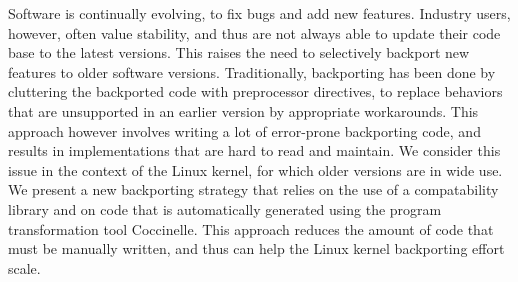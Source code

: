 Software is continually evolving, to fix bugs and add new features.
Industry users, however, often value stability, and thus are not always
able to update their code base to the latest versions.  This raises the
need to selectively backport new features to older software versions.
Traditionally, backporting has been done by cluttering the backported code
with preprocessor directives, to replace behaviors that are unsupported in
an earlier version by appropriate workarounds.  This approach however
involves writing a lot of error-prone backporting code, and results in
implementations that are hard to read and maintain.  We consider this issue
in the context of the Linux kernel, for which older versions are in wide
use.  We present a new backporting strategy that relies on the use of a
compatability library and on code that is automatically generated using the
program transformation tool Coccinelle.  This approach reduces the amount
of code that must be manually written, and thus can help the Linux kernel
backporting effort scale.
